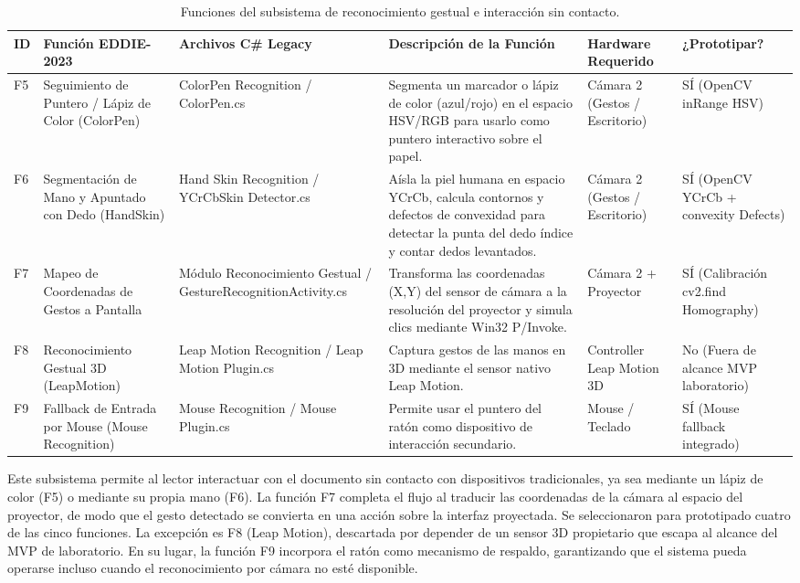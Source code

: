 \begin{table}[H]
    \centering
    \caption{Funciones del subsistema de reconocimiento gestual e interacción sin contacto.}
    \label{tab:func_reconocimiento_gestual}
    \begin{small}
    \begin{tabular}{|L{0.6cm}|L{2.2cm}|L{2.2cm}|L{4.1cm}|L{1.6cm}|L{1.8cm}|}
        \hline
        \textbf{ID} & \textbf{Función EDDIE-2023} & \textbf{Archivos C\# Legacy} & \textbf{Descripción de la Función} & \textbf{Hardware Requerido} & \textbf{¿Prototipar?} \\ \hline
        F5 & Seguimiento de Puntero / Lápiz de Color (ColorPen) & ColorPen Recognition / ColorPen.cs & Segmenta un marcador o lápiz de color (azul/rojo) en el espacio HSV/RGB para usarlo como puntero interactivo sobre el papel. & Cámara 2 (Gestos / Escritorio) & SÍ (OpenCV inRange HSV) \\ \hline
        F6 & Segmentación de Mano y Apuntado con Dedo (HandSkin) & Hand Skin Recognition / YCrCbSkin Detector.cs & Aísla la piel humana en espacio YCrCb, calcula contornos y defectos de convexidad para detectar la punta del dedo índice y contar dedos levantados. & Cámara 2 (Gestos / Escritorio) & SÍ (OpenCV YCrCb + convexity Defects) \\ \hline
        F7 & Mapeo de Coordenadas de Gestos a Pantalla & Módulo Reconocimiento Gestual / GestureRecognitionActivity.cs & Transforma las coordenadas (X,Y) del sensor de cámara a la resolución del proyector y simula clics mediante Win32 P/Invoke. & Cámara 2 + Proyector & SÍ (Calibración cv2.find Homography) \\ \hline
        F8 & Reconocimiento Gestual 3D (LeapMotion) & Leap Motion Recognition / Leap Motion Plugin.cs & Captura gestos de las manos en 3D mediante el sensor nativo Leap Motion. & Controller Leap Motion 3D & No (Fuera de alcance MVP laboratorio) \\ \hline
        F9 & Fallback de Entrada por Mouse (Mouse Recognition) & Mouse Recognition / Mouse Plugin.cs & Permite usar el puntero del ratón como dispositivo de interacción secundario. & Mouse / Teclado & SÍ (Mouse fallback integrado) \\ \hline
    \end{tabular}
    \end{small}
\end{table}
 
Este subsistema permite al lector interactuar con el documento sin contacto con dispositivos tradicionales, ya sea mediante un lápiz de color (F5) o mediante su propia mano (F6). La función F7 completa el flujo al traducir las coordenadas de la cámara al espacio del proyector, de modo que el gesto detectado se convierta en una acción sobre la interfaz proyectada. Se seleccionaron para prototipado cuatro de las cinco funciones. La excepción es F8 (Leap Motion), descartada por depender de un sensor 3D propietario que escapa al alcance del MVP de laboratorio. En su lugar, la función F9 incorpora el ratón como mecanismo de respaldo, garantizando que el sistema pueda operarse incluso cuando el reconocimiento por cámara no esté disponible.
 
